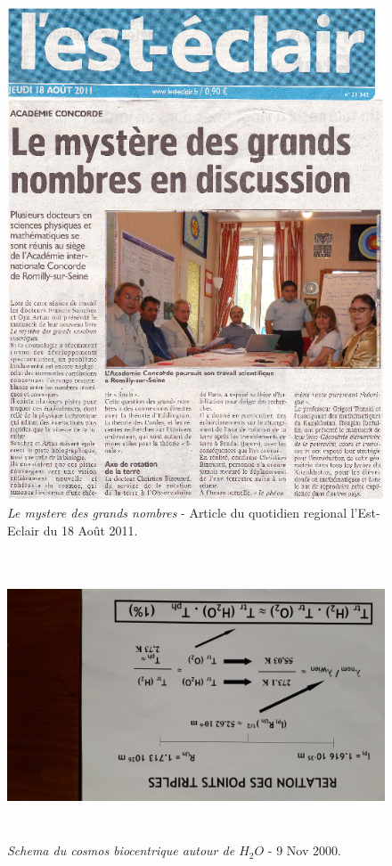 \documentclass[a4paper,12pt]{article}
\begin{document}
\begin{appendix}
\begin{figure}
\centering
\includegraphics{./figures/lesteclair.png}
\caption [L'est-Eclair: Le mystere des grands nombres]{\textit{Le mystere des grands nombres} - Article du quotidien regional l'Est-Eclair du 18 Ao\^ut 2011.} 
\label{fig:5:figure5}
\end{figure}


\begin{figure}
\centering
\includegraphics[width=14.5cm,height=8.5cm]{./figures/Zpointstriples.jpg}
\caption[Relation des Points Triples ]{\textit{Schema du cosmos biocentrique autour de $H_2O$} - 9 Nov 2000.} 
\end{figure}






\end{appendix}
\end{document}
